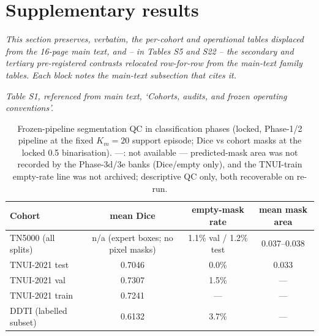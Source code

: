 \documentclass[11pt]{article}
\begin{document}

\section{Supplementary results}\label{sm:results}

\noindent\emph{This section preserves, verbatim, the per-cohort and
operational tables displaced from the 16-page main text, and -- in
Tables S5 and S22 -- the secondary and tertiary pre-registered
contrasts relocated row-for-row from the main-text family tables.
Each block notes the main-text subsection that cites it.}

\noindent\emph{Table S1, referenced from main text, `Cohorts, audits, and frozen operating conventions'.}

\begin{table}[!ht]
\centering\small
\caption{Frozen-pipeline segmentation QC in classification phases (locked,
Phase-1/2 pipeline at the fixed $K_m{=}20$ support episode; Dice vs cohort
masks at the locked 0.5 binarisation). ---: not available --- predicted-mask
area was not recorded by the Phase-3d/3e banks (Dice/empty only), and the
TNUI-train empty-rate line was not archived; descriptive QC only, both
recoverable on re-run.}
\label{tab:segqc}
\begin{tabular}{lccc}
\toprule
Cohort & mean Dice & empty-mask rate & mean mask area \\
\midrule
TN5000 (all splits) & n/a (expert boxes; no pixel masks) & 1.1\% val / 1.2\% test & 0.037--0.038 \\
TNUI-2021 test  & 0.7046 & 0.0\% & 0.033 \\
TNUI-2021 val   & 0.7307 & 1.5\% & --- \\
TNUI-2021 train & 0.7241 & --- & --- \\
DDTI (labelled subset) & 0.6132 & 3.7\% & --- \\
\bottomrule
\end{tabular}
\end{table}
\end{document}
